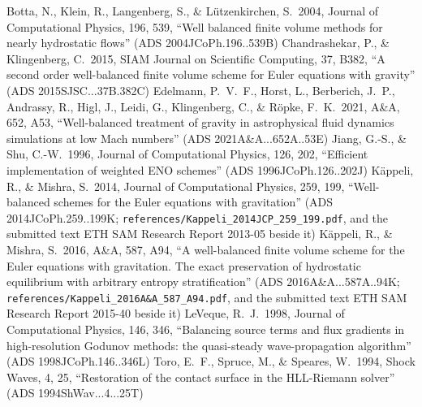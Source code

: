 \documentclass[english,a4paper]{my_memo}
\begin{document}

\begin{thebibliography}{}
Botta, N., Klein, R., Langenberg, S., \& L\"utzenkirchen, S.\ 2004, Journal of
Computational Physics, 196, 539, ``Well balanced finite volume methods for
nearly hydrostatic flows'' (ADS 2004JCoPh.196..539B)
Chandrashekar, P., \& Klingenberg, C.\ 2015, SIAM Journal on Scientific
Computing, 37, B382, ``A second order well-balanced finite volume scheme for
Euler equations with gravity'' (ADS 2015SJSC...37B.382C)
Edelmann, P.~V.~F., Horst, L., Berberich, J.~P., Andrassy, R., Higl, J.,
Leidi, G., Klingenberg, C., \& R\"opke, F.~K.\ 2021, A\&A, 652, A53,
``Well-balanced treatment of gravity in astrophysical fluid dynamics
simulations at low Mach numbers'' (ADS 2021A\&A...652A..53E)
Jiang, G.-S., \& Shu, C.-W.\ 1996, Journal of Computational Physics, 126,
202, ``Efficient implementation of weighted ENO schemes''
(ADS 1996JCoPh.126..202J)
K\"appeli, R., \& Mishra, S.\ 2014, Journal of Computational Physics, 259,
199, ``Well-balanced schemes for the Euler equations with gravitation''
(ADS 2014JCoPh.259..199K; \texttt{references/Kappeli\_2014JCP\_259\_199.pdf},
and the submitted text ETH SAM Research Report 2013-05 beside it)
K\"appeli, R., \& Mishra, S.\ 2016, A\&A, 587, A94, ``A well-balanced finite
volume scheme for the Euler equations with gravitation. The exact
preservation of hydrostatic equilibrium with arbitrary entropy
stratification'' (ADS 2016A\&A...587A..94K; \texttt{references/Kappeli\_2016A\&A\_587\_A94.pdf},
and the submitted text ETH SAM Research Report 2015-40 beside it)
LeVeque, R.~J.\ 1998, Journal of Computational Physics, 146, 346, ``Balancing
source terms and flux gradients in high-resolution Godunov methods: the
quasi-steady wave-propagation algorithm'' (ADS 1998JCoPh.146..346L)
Toro, E.~F., Spruce, M., \& Speares, W.\ 1994, Shock Waves, 4, 25,
``Restoration of the contact surface in the HLL-Riemann solver''
(ADS 1994ShWav...4...25T)
\end{thebibliography}
\end{document}
